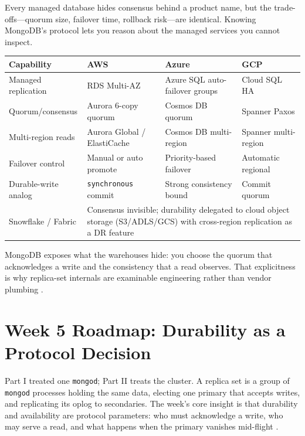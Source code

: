 \begin{crosscloud}
Every managed database hides consensus behind a product name, but the trade-offs---quorum size, failover time, rollback risk---are identical. Knowing MongoDB's protocol lets you reason about the managed services you cannot inspect.

\vspace{2mm}
{\footnotesize
\begin{tabular}{@{}p{2.9cm}p{3.0cm}p{3.0cm}p{3.0cm}@{}} 
\toprule
\textbf{Capability} & \textbf{AWS} & \textbf{Azure} & \textbf{GCP} \\
\midrule
Managed replication & RDS Multi-AZ & Azure SQL auto-failover groups & Cloud SQL HA \\
Quorum/consensus & Aurora 6-copy quorum & Cosmos DB quorum & Spanner Paxos \\
Multi-region reads & Aurora Global / ElastiCache & Cosmos DB multi-region & Spanner multi-region \\
Failover control & Manual or auto promote & Priority-based failover & Automatic regional \\
Durable-write analog & \texttt{synchronous} commit & Strong consistency bound & Commit quorum \\
\addlinespace
Snowflake / Fabric & \multicolumn{3}{l}{Consensus invisible; durability delegated to cloud object storage (S3/ADLS/GCS) with cross-region replication as a DR feature} \\
\bottomrule
\end{tabular}}

\vspace{1mm}
MongoDB exposes what the warehouses hide: you choose the quorum that acknowledges a write and the consistency that a read observes. That explicitness is why replica-set internals are examinable engineering rather than vendor plumbing \cite{mongodbReplicationDocs,ongaro2014raft}.
\end{crosscloud}

\section{Week 5 Roadmap: Durability as a Protocol Decision}
Part I treated one \texttt{mongod}; Part II treats the cluster. A replica set is a group of \texttt{mongod} processes holding the same data, electing one primary that accepts writes, and replicating its oplog to secondaries. The week's core insight is that durability and availability are protocol parameters: who must acknowledge a write, who may serve a read, and what happens when the primary vanishes mid-flight \cite{mongodbReplicationDocs}.

